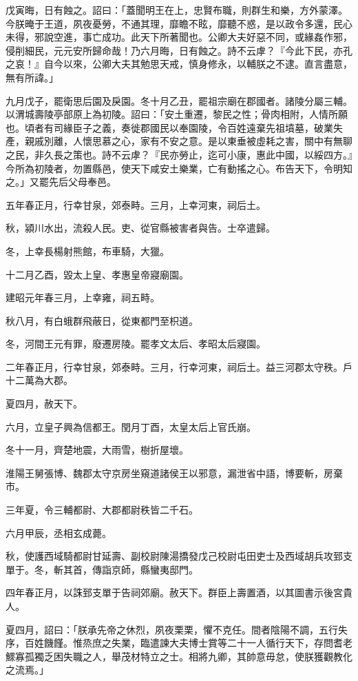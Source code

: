 \begin{pinyinscope}
戊寅晦，日有蝕之。詔曰：「蓋聞明王在上，忠賢布職，則群生和樂，方外蒙澤。今朕晻于王道，夙夜憂勞，不通其理，靡瞻不眩，靡聽不惑，是以政令多還，民心未得，邪說空進，事亡成功。此天下所著聞也。公卿大夫好惡不同，或緣姦作邪，侵削細民，元元安所歸命哉！乃六月晦，日有蝕之。詩不云虖？『今此下民，亦孔之哀！』自今以來，公卿大夫其勉思天戒，慎身修永，以輔朕之不逮。直言盡意，無有所諱。」

九月戊子，罷衛思后園及戾園。冬十月乙丑，罷祖宗廟在郡國者。諸陵分屬三輔。以渭城壽陵亭部原上為初陵。詔曰：「安土重遷，黎民之性；骨肉相附，人情所願也。頃者有司緣臣子之義，奏徙郡國民以奉園陵，令百姓遠棄先祖墳墓，破業失產，親戚別離，人懷思慕之心，家有不安之意。是以東垂被虛耗之害，關中有無聊之民，非久長之策也。詩不云虖？『民亦勞止，迄可小康，惠此中國，以綏四方。』今所為初陵者，勿置縣邑，使天下咸安土樂業，亡有動搖之心。布告天下，令明知之。」又罷先后父母奉邑。

五年春正月，行幸甘泉，郊泰畤。三月，上幸河東，祠后土。

秋，潁川水出，流殺人民。吏、從官縣被害者與告。士卒遣歸。

冬，上幸長楊射熊館，布車騎，大獵。

十二月乙酉，毀太上皇、孝惠皇帝寢廟園。

建昭元年春三月，上幸雍，祠五畤。

秋八月，有白蛾群飛蔽日，從東都門至枳道。

冬，河間王元有罪，廢遷房陵。罷孝文太后、孝昭太后寢園。

二年春正月，行幸甘泉，郊泰畤。三月，行幸河東，祠后土。益三河郡太守秩。戶十二萬為大郡。

夏四月，赦天下。

六月，立皇子興為信都王。閏月丁酉，太皇太后上官氏崩。

冬十一月，齊楚地震，大雨雪，樹折屋壞。

淮陽王舅張博、魏郡太守京房坐窺道諸侯王以邪意，漏泄省中語，博要斬，房棄市。

三年夏，令三輔都尉、大郡都尉秩皆二千石。

六月甲辰，丞相玄成薨。

秋，使護西域騎都尉甘延壽、副校尉陳湯撟發戊己校尉屯田吏士及西域胡兵攻郅支單于。冬，斬其首，傳詣京師，縣蠻夷邸門。

四年春正月，以誅郅支單于告祠郊廟。赦天下。群臣上壽置酒，以其圖書示後宮貴人。

夏四月，詔曰：「朕承先帝之休烈，夙夜栗栗，懼不克任。間者陰陽不調，五行失序，百姓饑饉。惟烝庶之失業，臨遣諫大夫博士賞等二十一人循行天下，存問耆老鰥寡孤獨乏困失職之人，舉茂材特立之士。相將九卿，其帥意毋怠，使朕獲觀教化之流焉。」


\end{pinyinscope}
